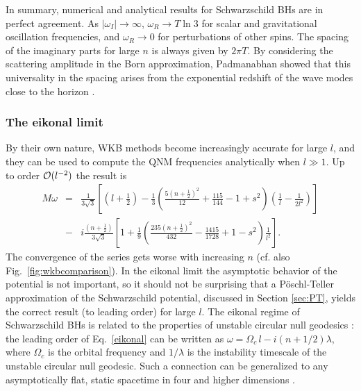\documentclass[]{iopart}
\def\beq{\begin{eqnarray}}
\def\eeq{\end{eqnarray}}
\def\f{\frac}
\def\nn{\nonumber}
\def\f{\frac}
\begin{document}
In summary, numerical and analytical results for Schwarzschild BHs are in
perfect agreement. As $|\omega_I|\to \infty$, $\omega_R \to T \ln 3$ for
scalar and gravitational oscillation frequencies, and $\omega_R \to 0$ for
perturbations of other spins. The spacing of the imaginary parts for large $n$
is always given by $2\pi T$. By considering the scattering amplitude in the
Born approximation, Padmanabhan showed that this universality in the spacing
arises from the exponential redshift of the wave modes close to the horizon
\cite{Padmanabhan:2003fx}.

\subsubsection*{The eikonal limit}

By their own nature, WKB methods become increasingly accurate for large $l$,
and they can be used to compute the QNM frequencies analytically when $l\gg
1$. Up to order ${\cal O}(l^{-2})$ the result is
\cite{pressringdown,Iyer:1986np,Iyer:1986nq,barretozworski}
%
\beq M\omega&=&\f{1}{3\sqrt{3}} \left[\left (l+\frac{1}{2}\right )
  -\f{1}{3}\left(\f{5(n+\frac{1}{2})^2}{12}+\f{115}{144}-1+s^2
  \right)\left(\f{1}{l}-\f{1}{2l^2}\right)\right]\nn
\\ &-&i\f{(n+\frac{1}{2})}{3\sqrt{3}}\left[1+\f{1}{9}
  \left(\f{235(n+\frac{1}{2})^2}{432}-\f{1415}{1728}+1-s^2\right)\f{1}{l^2}\right].
\label{eikonal}
\eeq
%
The convergence of the series gets worse with increasing $n$ (cf. also
Fig.~\ref{fig:wkbcomparison}).  In the eikonal limit the asymptotic behavior
of the potential is not important, so it should not be surprising that a
P\"oschl-Teller approximation of the Schwarzschild potential, discussed in
Section \ref{sec:PT}, yields the correct result (to leading order) for large
$l$.  The eikonal regime of Schwarzschild BHs is related to the properties of
unstable circular null geodesics
\cite{pressringdown,goebel,Ferrari:1984zz,mashhoon,stewart,
  Decanini:2002ha,Cardoso:2008bp,Decanini:2009mu}: the leading order of
Eq.~\ref{eikonal} can be written as $\omega=\Omega_c \, l-i\left (n+1/2 \right
)\lambda$, where $\Omega_c$ is the orbital frequency and $1/\lambda$ is the
instability timescale of the unstable circular null geodesic. Such a
connection can be generalized to any asymptotically flat, static spacetime in
four and higher dimensions \cite{Cardoso:2008bp}.
\end{document}
